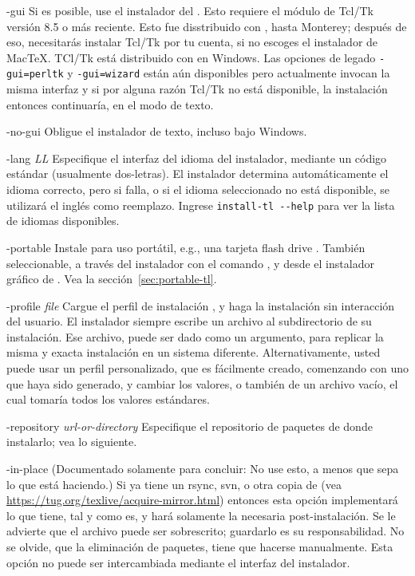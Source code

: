 \documentclass{article}
\begin{document}
\begin{ttdescription}
\item[-gui] Si es posible, use el instalador del \GUI{}. Esto requiere
	el módulo de Tcl/Tk versión 8.5 o más reciente.  Esto fue
	disstribuido con \MacOSX, hasta Monterey; después de eso, necesitarás
	instalar Tcl/Tk por tu cuenta, si no escoges el instalador de
	Mac\TeX{}. TCl/Tk está distribuido con \TL{} en Windows. 
	Las opciones de legado \texttt{-gui=perltk} y \texttt{-gui=wizard}
	están aún disponibles pero actualmente invocan la misma interfaz \GUI{}
	y si por alguna razón Tcl/Tk no está disponible, la instalación entonces
	continuaría, en el modo de texto. 

\item[-no-gui] Obligue el instalador de texto, incluso bajo Windows. 

\item[-lang {\sl LL}] Especifique el interfaz del idioma del
	instalador, mediante un código estándar (usualmente
	dos-letras). El instalador determina automáticamente el idioma
	correcto, pero si falla, o si el idioma seleccionado no está
	disponible, se utilizará el inglés como reemplazo. Ingrese
	\verb|install-tl --help| para ver la lista de idiomas
	disponibles.

\item[-portable] Instale para uso portátil, e.g., una tarjeta flash
	drive \USB{}. También seleccionable, a través del instalador
	con el comando , y desde el instalador gráfico de
	\GUI{}. Vea la sección~\ref{sec:portable-tl}.

\item[-profile {\sl file}] Cargue el perfil de instalación ,
	y haga la instalación sin interacción del usuario. El
	instalador siempre escribe un archivo
	 al subdirectorio  de
	su instalación. Ese archivo, puede ser dado como un argumento,
	para replicar la misma y exacta instalación en un sistema
	diferente. Alternativamente, usted puede usar un perfil
	personalizado, que es fácilmente creado, comenzando con uno
	que haya sido generado, y cambiar los valores, o también de un
	archivo vacío, el cual tomaría todos los valores estándares.

\item[-repository {\sl url-or-directory}] Especifique el repositorio
	de paquetes de donde instalarlo; vea lo siguiente.


\item[-in-place] (Documentado solamente para concluir: No use esto, a
	menos que sepa lo que está haciendo.) Si ya tiene un rsync,
	svn, o otra copia de \TL{} (vea
	\url{https://tug.org/texlive/acquire-mirror.html}) entonces
	esta opción implementará lo que tiene, tal y como es, y hará
	solamente la necesaria post-instalación. Se le advierte que el
	archivo  puede ser sobrescrito;
	guardarlo es su responsabilidad. No se olvide, que la
	eliminación de paquetes, tiene que hacerse manualmente. Esta
	opción no puede ser intercambiada mediante el interfaz del
	instalador. 
\end{ttdescription}
\end{document}
